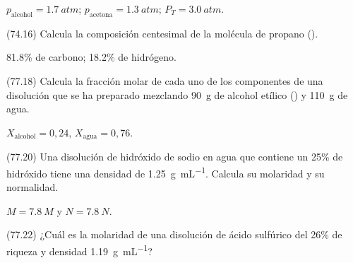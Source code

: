 \documentclass[10pt,a5paper,twoside]{article}
\begin{document}
    \begin{solution}
      \( p_\textrm{alcohol} = \SI{1.7}{atm} \);
      \( p_\textrm{acetona} = \SI{1.3}{atm} \);
      \( P_T = \SI{3.0}{atm} \).
    \end{solution}




    \begin{exercise}[
        tags    = {},
        topics  = {química,química básica},
        source  = {FQ 1B MGH 2016, p74, e16},
      ]
      (74.16) Calcula la composición centesimal de la molécula de propano ().
    \end{exercise}

    \begin{solution}
      \num{81,8}\% de carbono; \num{18,2}\% de hidrógeno.
    \end{solution}




    \begin{exercise}[
        tags    = {},
        topics  = {química,química básica},
        source  = {FQ 1B MGH 2016, p77, e18},
      ]
      (77.18) Calcula la fracción molar de cada uno de los componentes
      de una disolución que se ha preparado mezclando \SI{90}{\gram} de alcohol etílico () y \SI{110}{\gram} de agua.
    \end{exercise}

    \begin{solution}
      \( X_\textrm{alcohol} = 0,24 \),
      \( X_\textrm{agua} = 0,76 \).
    \end{solution}




    \begin{exercise}[
        tags    = {},
        topics  = {química,química básica},
        source  = {FQ 1B MGH 2016, p77, e20},
      ]
      (77.20) Una disolución de hidróxido de sodio en agua que contiene un 25\% de hidróxido tiene una densidad de \SI{1.25}{\gram\per\milli\liter}. Calcula
      su molaridad y su normalidad.
    \end{exercise}

    \begin{solution}
      \( M = \SI{7.8}{M} \)  y  \( N = \SI{7.8}{N} \).
    \end{solution}




    \begin{exercise}[
        tags    = {},
        topics  = {química,química básica},
        source  = {FQ 1B MGH 2016, p77, e22},
      ]
      (77.22) ¿Cuál es la molaridad de una disolución de ácido sulfúrico
      del 26\% de riqueza y densidad \SI{1.19}{\gram\per\milli\liter}?
    \end{exercise}
\end{document}
